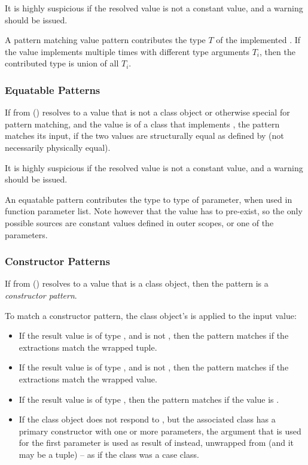 It is highly suspicious if the resolved value is not a constant value, and a warning should be issued. 

A pattern matching value pattern contributes the type $T$ of the implemented . If the value implements  multiple times with different type arguments $T_i$, then the contributed type is union of all $T_i$. 





\subsubsection{Equatable Patterns}
\label{sec:equatable-patterns}

If  from () resolves to a value that is not a class object or otherwise special for pattern matching, and the value is of a class that implements , the pattern matches its input, if the two values are structurally equal as defined by  (not necessarily physically equal).

It is highly suspicious if the resolved value is not a constant value, and a warning should be issued. 

An equatable pattern contributes the type  to type of parameter, when used in function parameter list. Note however that the value has to pre-exist, so the only possible sources are constant values defined in outer scopes, or one of the parameters.





\subsubsection{Constructor Patterns}
\label{sec:constructor-patterns}

If  from () resolves to a value that is a class object, then the pattern is a {\em constructor pattern}. 

To match a constructor pattern, the class object's  is applied to the input value:
\begin{itemize}
  \item If the result value is of type , and is not , then the pattern matches if the extractions match the wrapped tuple. 
  \item If the result value is of type , and is not , then the pattern matches if the extractions match the wrapped value. 
  \item If the result value is of type , then the pattern matches if the value is . 
  \item If the class object does not respond to , but the associated class has a primary constructor with one or more parameters, the argument that is used for the first parameter is used as result of  instead, unwrapped from  (and it may be a tuple) -- as if the class was a case class. 
\end{itemize} 

